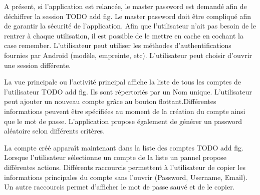 A présent, si l'application est relancée, le master password est demandé afin de déchiffrer la session TODO add fig. Le master password doit être compliqué afin de garantir la sécurité de l'application. Afin que l'utilisateur n'ait pas besoin de le rentrer à chaque utilisation, il est possible de le mettre en cache en cochant la case remember. L'utilisateur peut utiliser les méthodes d'authentifications fournies par Android (modèle, empreinte, etc). L'utilisateur peut choisir d'ouvrir une session différente. 

\begin{center}
	\begin{minipage}{.3\textwidth}
	\end{minipage}
	\begin{minipage}{.3\textwidth}
	\end{minipage}        
\end{center}

La vue principale ou l'activité principal affiche la liste de tous les comptes de l'utilisateur TODO add fig. Ils sont répertoriés par un Nom unique. L'utilisateur peut ajouter un nouveau compte grâce au bouton flottant.Différentes informations peuvent être spécifiées au moment de la création du compte ainsi que le mot de passe. L'application \easypass{} propose également de générer un password aléatoire selon différents critères. 

\begin{center}
	\begin{minipage}{.3\textwidth}
	\end{minipage}
	\begin{minipage}{.3\textwidth}
	\end{minipage}
	\begin{minipage}{.3\textwidth}
	\end{minipage}        
\end{center}

La compte créé apparaît maintenant dans la liste des comptes TODO add fig. Lorsque l'utilisateur sélectionne un compte de la liste un pannel propose différentes actions.
Différents raccourcis permettent à l'utilisateur de copier les informations principales du compte sans l'ouvrir (Password, Username, Email). Un autre raccourcis permet d'afficher le mot de passe sauvé et de le copier. 

